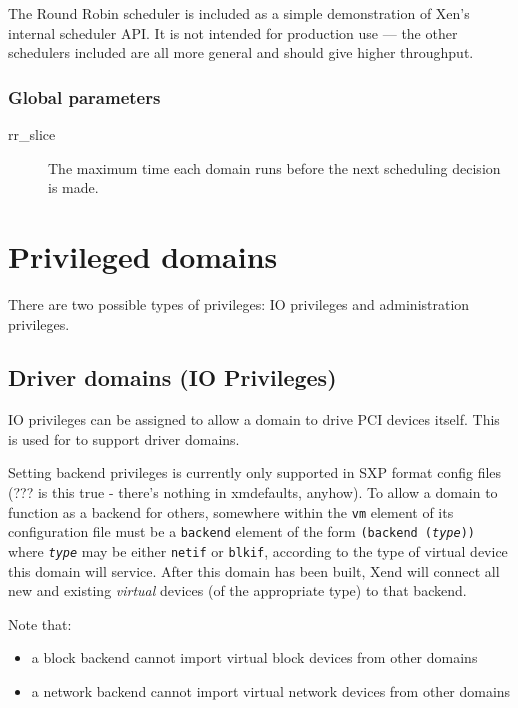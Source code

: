 \documentclass[11pt,twoside,final,openright]{xenstyle}
\begin{document}
The Round Robin scheduler is included as a simple demonstration of
Xen's internal scheduler API.  It is not intended for production use
--- the other schedulers included are all more general and should give
higher throughput.

\subsection{Global parameters}

\begin{description}
\item[rr\_slice]
  The maximum time each domain runs before the next
  scheduling decision is made.
\end{description}

\chapter{Privileged domains}

There are two possible types of privileges: IO privileges and
administration privileges.

\section{Driver domains (IO Privileges)}

IO privileges can be assigned to allow a domain to drive PCI devices
itself.  This is used for to support driver domains.

Setting backend privileges is currently only supported in SXP format
config files (??? is this true - there's nothing in xmdefaults,
anyhow).  To allow a domain to function as a backend for others,
somewhere within the {\tt vm} element of its configuration file must
be a {\tt backend} element of the form {\tt (backend ({\em type}))}
where {\tt \em type} may be either {\tt netif} or {\tt blkif},
according to the type of virtual device this domain will service.
After this domain has been built, Xend will connect all new and
existing {\em virtual} devices (of the appropriate type) to that
backend.

Note that:
\begin{itemize}
\item a block backend cannot import virtual block devices from other
domains
\item a network backend cannot import virtual network devices from
other domains
\end{itemize}
\end{document}
